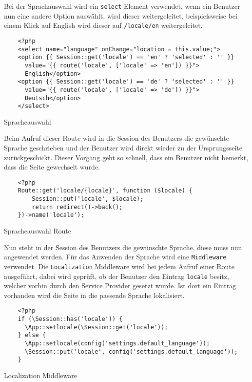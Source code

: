 Bei der Sprachauswahl wird ein \verb|select| Element verwendet, wenn ein
Benutzer nun eine andere Option auswählt, wird dieser weitergeleitet,
beispielsweise bei einem Klick auf English wird dieser auf \verb|/locale/en|
weitergeleitet. 

\begin{listing}[H]
  \begin{verbatim}
    <?php
    <select name="language" onChange="location = this.value;">
    <option {{ Session::get('locale') == 'en' ? 'selected' : '' }}
      value="{{ route('locale', ['locale' => 'en']) }}">
      English</option>
    <option {{ Session::get('locale') == 'de' ? 'selected' : '' }}
      value="{{ route('locale', ['locale' => 'de']) }}">
      Deutsch</option>
    </select>
  \end{verbatim}
  \caption{Spracheauswahl}
\end{listing}

Beim Aufruf dieser Route wird in die Session des Benutzers die gewünschte
Sprache geschrieben und der Benutzer wird direkt wieder zu der Ursprungsseite
zurückgeschickt. Dieser Vorgang geht so schnell, dass ein Benutzer nicht
bemerkt, dass die Seite gewechselt wurde.

\begin{listing}[H]
  \begin{verbatim}
    <?php
    Route::get('locale/{locale}', function ($locale) {
        Session::put('locale', $locale);
        return redirect()->back();
    })->name('locale');
  \end{verbatim}
  \caption{Spracheauswahl Route}
\end{listing}

Nun steht in der Session des Benutzers die gewünschte Sprache, diese muss nun
angewendet werden. Für das Anwenden der Sprache wird eine \verb|Middleware|
verwendet. Die \verb|Localization| Middleware wird bei jedem Aufruf einer Route
ausgeführt, dabei wird geprüft, ob der Benutzer den Eintrag \verb|locale|
besitz, welcher vorhin durch den Service Provider gesetzt wurde. Ist dort ein
Eintrag vorhanden wird die Seite in die passende Sprache lokalisiert.

\begin{listing}[H]
  \begin{verbatim}
    <?php
    if (\Session::has('locale')) {
      \App::setlocale(\Session::get('locale'));
    } else {
      \App::setlocale(config('settings.default_language'));
      \Session::put('locale', config('settings.default_language'));
    }
  \end{verbatim}
  \caption{Localization Middleware}
\end{listing}


